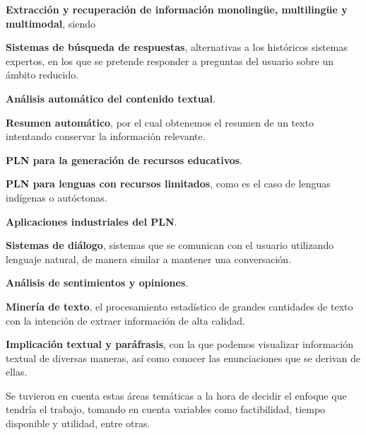 \textbf{Extracción y recuperación de información monolingüe, multilingüe y multimodal}, siendo 

\textbf{Sistemas de búsqueda de respuestas}, alternativas a los históricos sistemas expertos, en los que se pretende responder a preguntas del usuario sobre un ámbito reducido.

\textbf{Análisis automático del contenido textual}.

\textbf{Resumen automático}, por el cual obtenemos el resumen de un texto intentando conservar la información relevante.

\textbf{PLN para la generación de recursos educativos}.

\textbf{PLN para lenguas con recursos limitados}, como es el caso de lenguas indígenas o autóctonas.

\textbf{Aplicaciones industriales del PLN}.

\textbf{Sistemas de diálogo}, sistemas que se comunican con el usuario utilizando lenguaje natural, de manera similar a mantener una conversación. 

\textbf{Análisis de sentimientos y opiniones}.

\textbf{Minería de texto}, el procesamiento estadístico de grandes cantidades de texto con la intención de extraer información de alta calidad.


\textbf{Implicación textual y paráfrasis}, con la que podemos visualizar información textual de diversas maneras, así como conocer las enunciaciones que se derivan de ellas.

Se tuvieron en cuenta estas áreas temáticas a la hora de decidir el enfoque que tendría el trabajo, tomando en cuenta variables como factibilidad, tiempo disponible y utilidad, entre otras.

